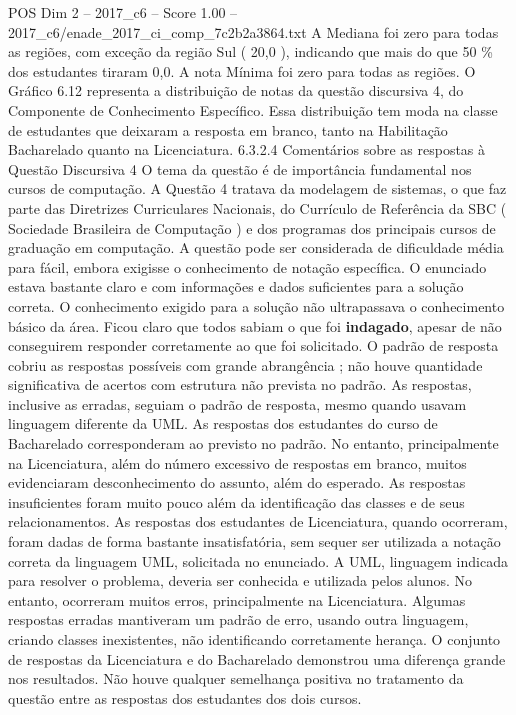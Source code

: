 \begin{textsample}{POS Dim 2 – 2017\_c6 – Score 1.00 – 2017\_c6/enade\_2017\_ci\_comp\_7c2b2a3864.txt}
A Mediana foi zero para todas as regiões, com exceção da região Sul ( 20,0 ), indicando que mais do que 50 \% dos estudantes tiraram 0,0.
A nota Mínima foi zero para todas as regiões.
O Gráfico 6.12 representa a distribuição de notas da questão discursiva 4, do Componente de Conhecimento Específico.
Essa distribuição tem moda na classe de estudantes que deixaram a resposta em branco, tanto na Habilitação Bacharelado quanto na Licenciatura. 6.3.2.4 Comentários sobre as respostas à Questão Discursiva 4 O tema da questão é de importância fundamental nos cursos de computação.
A Questão 4 tratava da modelagem de sistemas, o que faz parte das Diretrizes Curriculares Nacionais, do Currículo de Referência da SBC ( Sociedade Brasileira de Computação ) e dos programas dos principais cursos de graduação em computação.
A questão pode ser considerada de dificuldade média para fácil, embora exigisse o conhecimento de notação específica.
O enunciado estava bastante claro e com informações e dados suficientes para a solução correta.
O conhecimento exigido para a solução não ultrapassava o conhecimento básico da área.
Ficou claro que todos sabiam o que foi \textbf{indagado}, apesar de não conseguirem responder corretamente ao que foi solicitado.
O padrão de resposta cobriu as respostas possíveis com grande abrangência ; não houve quantidade significativa de acertos com estrutura não prevista no padrão.
As respostas, inclusive as erradas, seguiam o padrão de resposta, mesmo quando usavam linguagem diferente da UML.
As respostas dos estudantes do curso de Bacharelado corresponderam ao previsto no padrão.
No entanto, principalmente na Licenciatura, além do número excessivo de respostas em branco, muitos evidenciaram desconhecimento do assunto, além do esperado.
As respostas insuficientes foram muito pouco além da identificação das classes e de seus relacionamentos.
As respostas dos estudantes de Licenciatura, quando ocorreram, foram dadas de forma bastante insatisfatória, sem sequer ser utilizada a notação correta da linguagem UML, solicitada no enunciado.
A UML, linguagem indicada para resolver o problema, deveria ser conhecida e utilizada pelos alunos.
No entanto, ocorreram muitos erros, principalmente na Licenciatura.
Algumas respostas erradas mantiveram um padrão de erro, usando outra linguagem, criando classes inexistentes, não identificando corretamente herança.
O conjunto de respostas da Licenciatura e do Bacharelado demonstrou uma diferença grande nos resultados.
Não houve qualquer semelhança positiva no tratamento da questão entre as respostas dos estudantes dos dois cursos.

\end{textsample}
